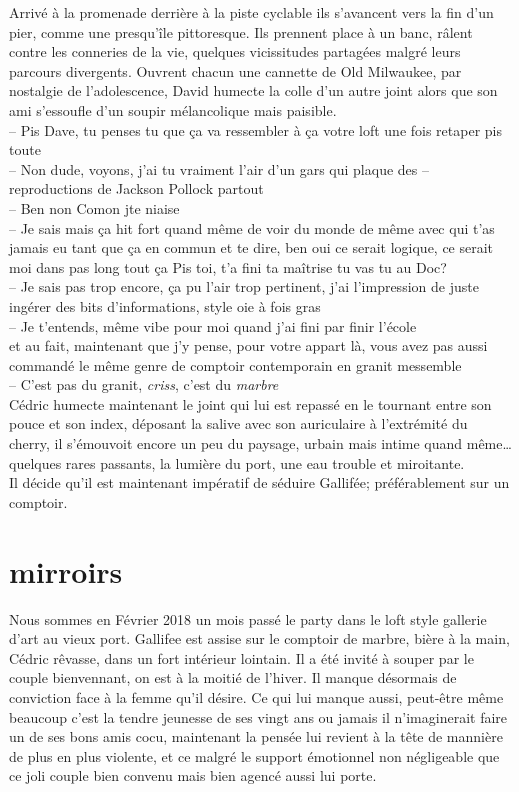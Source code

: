 \documentclass{article}
\begin{document}
Arrivé à la promenade derrière à la piste cyclable ils s'avancent vers la
fin d'un pier, comme une presqu'île pittoresque.
Ils prennent place à un
banc, râlent contre les conneries de la vie, quelques vicissitudes partagées
malgré leurs parcours divergents. Ouvrent chacun une cannette de Old Milwaukee,
par nostalgie de l'adolescence, David humecte la colle d'un autre joint alors que
son ami s'essoufle d'un soupir mélancolique mais paisible. \\
-- Pis Dave, tu penses tu que ça va ressembler à ça votre loft une fois retaper pis toute\\
-- Non dude, voyons, j'ai tu vraiment l'air d'un gars qui plaque des
-- reproductions de Jackson Pollock partout \\
-- Ben non Comon jte niaise\\
-- Je sais mais ça hit fort quand même de voir du monde de même avec qui
t'as jamais eu tant que ça en commun et te dire, ben oui ce serait logique,
ce serait moi dans pas long tout ça \textelp{} Pis toi, t'a fini ta maîtrise tu
vas tu au Doc?\\
-- Je sais pas trop encore, ça pu l'air trop pertinent, j'ai l'impression
de juste ingérer des bits d'informations, style oie à fois gras\\
-- Je t'entends, même vibe pour moi quand j'ai fini par finir l'école\\

\textelp{} et au fait, maintenant que j'y pense, pour votre appart là, vous
avez pas aussi commandé le même genre de comptoir contemporain en granit
messemble\\
-- C'est pas du granit, \emph{criss}, c'est du \emph{marbre}\\

Cédric humecte maintenant le joint qui lui est repassé en le tournant entre son
pouce et son index, déposant la salive avec son auriculaire à l'extrémité du
cherry, il s'émouvoit encore un peu du paysage, urbain mais intime quand
même\ldots quelques rares passants, la lumière du port, une eau trouble et
miroitante.\\[1ex]
Il décide qu'il est maintenant impératif de séduire Gallifée; préférablement sur un comptoir.
\clearpage


\section{mirroirs}

Nous sommes en Février 2018 un mois passé le party dans le loft style gallerie
d'art au vieux port. Gallifee est assise sur le comptoir de marbre, bière à la
main, Cédric rêvasse, dans un fort intérieur lointain. Il a été invité à souper
par le couple bienvennant, on est à la moitié de l'hiver. Il manque désormais de
conviction face à la femme qu'il désire. Ce qui lui manque aussi, peut-être même
beaucoup c'est la tendre jeunesse de ses vingt ans ou jamais il n'imaginerait
faire un de ses bons amis cocu, maintenant la pensée lui revient à la tête de
mannière de plus en plus violente, et ce malgré le support émotionnel non
négligeable que ce joli couple bien convenu mais bien agencé aussi lui porte. \\
\end{document}
